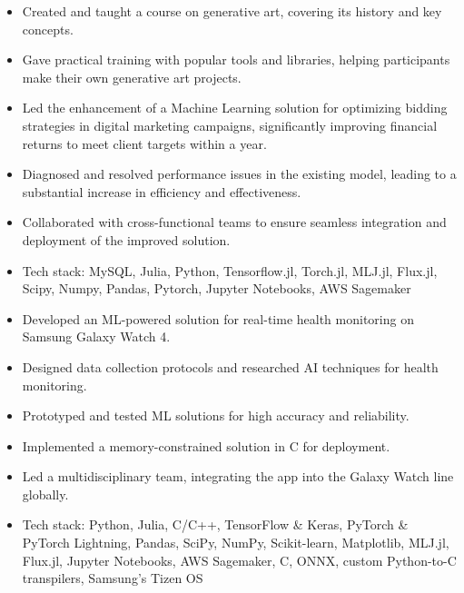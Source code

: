\documentclass[10pt,a4paper]{altacv}
\begin{document}
{\divider

\begin{itemize}
\item Created and taught a course on generative art, covering its history and key concepts.
\item Gave practical training with popular tools and libraries, helping participants make their own generative art projects.
\end{itemize}

\divider

\begin{itemize}
\item Led the enhancement of a Machine Learning solution for optimizing bidding strategies in digital marketing campaigns, significantly improving financial returns to meet client targets within a year.
\item Diagnosed and resolved performance issues in the existing model, leading to a substantial increase in efficiency and effectiveness.
\item Collaborated with cross-functional teams to ensure seamless integration and deployment of the improved solution.
\item Tech stack: MySQL, Julia, Python, Tensorflow.jl, Torch.jl, MLJ.jl, Flux.jl, Scipy, Numpy, Pandas, Pytorch, Jupyter Notebooks, AWS Sagemaker
\end{itemize}

\divider

\begin{itemize}
\item Developed an ML-powered solution for real-time health monitoring on Samsung Galaxy Watch 4.
\item Designed data collection protocols and researched AI techniques for health monitoring.
\item Prototyped and tested ML solutions for high accuracy and reliability.
\item Implemented a memory-constrained solution in C for deployment.
\item Led a multidisciplinary team, integrating the app into the Galaxy Watch line globally.
\item Tech stack: Python, Julia, C/C++, TensorFlow \& Keras, PyTorch \& PyTorch Lightning, Pandas, SciPy, NumPy, Scikit-learn, Matplotlib, MLJ.jl, Flux.jl, Jupyter Notebooks, AWS Sagemaker, C, ONNX, custom Python-to-C transpilers, Samsung's Tizen OS
\end{itemize}

}
\end{document}
